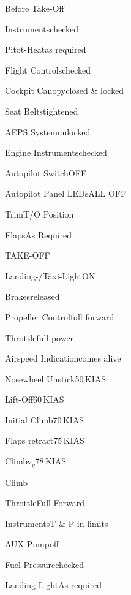 \begin{checklist}{Before Take-Off}
  \item{Instruments}{checked}
  \item{Pitot-Heat}{as required}
  \item{Flight Controls}{checked}
  \item{Cockpit Canopy}{closed \& locked}
  \item{Seat Belts}{tightened}
  \item{AEPS System}{unlocked}
  \item{Engine Instruments}{checked}
  \item{Autopilot Switch}{OFF}
  \item{Autopilot Panel LEDs}{ALL OFF}
  \item{Trim}{T/O Position}
  \item{Flaps}{As Required}
\end{checklist}

\begin{checklist}{TAKE-OFF}
  \item{Landing-/Taxi-Light}{ON}
  \item{Brakes}{released}
  \item{Propeller Control}{full forward}
  \item{Throttle}{full power}
  \item{Airspeed Indication}{comes alive}
  \item{Nosewheel Unstick}{50\,KIAS}
  \item{Lift-Off}{60\,KIAS}
  \item{Initial Climb}{70\,KIAS}
  \item{Flaps retract}{75\,KIAS}
  \item{Climb}{v$_{y}$78\,KIAS} 
\end{checklist}

\begin{checklist}{Climb}
  \item{Throttle}{Full Forward}
  \item{Instruments}{T \& P in limits}
  \item{AUX Pump}{off}
  \item{Fuel Pressure}{checked}
  \item{Landing Light}{As required}
\end{checklist}

